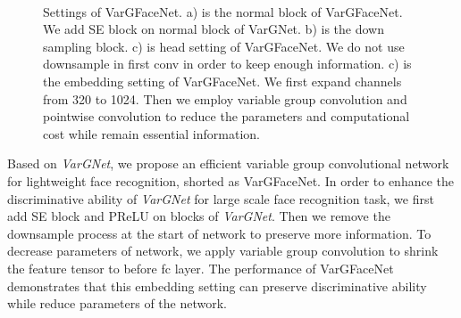 \documentclass[10pt,twocolumn,letterpaper]{article}
\begin{document}
\begin{figure*}
	\centering
	\\
	\caption{Settings of VarGFaceNet. a) is the normal block of VarGFaceNet. We add SE block on normal block of VarGNet. b) is the down sampling block. c) is head setting of VarGFaceNet. We do not use downsample in first conv in order to keep enough information. c) is the embedding setting of VarGFaceNet. We first expand channels from 320 to 1024. Then we employ variable group convolution and pointwise convolution to reduce the parameters and computational cost while remain essential information. }
	\label{ROC}
\end{figure*}

Based on \textit{VarGNet}, we propose an efficient variable group convolutional network for lightweight face recognition, shorted as VarGFaceNet. In order to enhance the discriminative ability of \textit{VarGNet} for large scale face recognition task, we first add SE block \cite{se} and PReLU \cite{prelu} on blocks of \textit{VarGNet}. Then we remove the downsample process at the start of network to preserve more information. To decrease parameters of network, we apply variable group convolution to shrink the feature tensor to  before fc layer. The performance of  VarGFaceNet demonstrates that this embedding setting can preserve discriminative ability while reduce parameters of the network.
\end{document}
